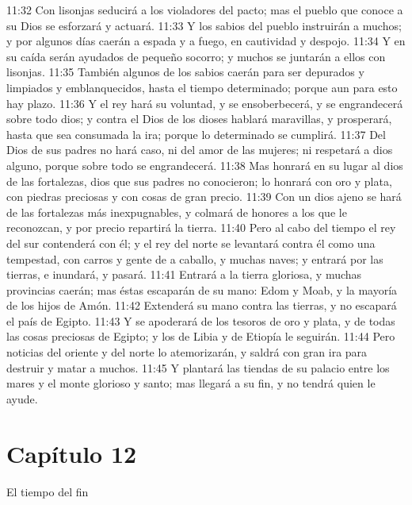 11:32 Con lisonjas seducirá a los violadores del pacto; mas el pueblo que conoce a su Dios se esforzará y actuará. 
11:33 Y los sabios del pueblo instruirán a muchos; y por algunos días caerán a espada y a fuego, en cautividad y despojo. 
11:34 Y en su caída serán ayudados de pequeño socorro; y muchos se juntarán a ellos con lisonjas. 
11:35 También algunos de los sabios caerán para ser depurados y limpiados y emblanquecidos, hasta el tiempo determinado; porque aun para esto hay plazo. 
11:36 Y el rey hará su voluntad, y se ensoberbecerá, y se engrandecerá sobre todo dios;  y contra el Dios de los dioses hablará maravillas, y prosperará, hasta que sea consumada la ira; porque lo determinado se cumplirá. 
11:37 Del Dios de sus padres no hará caso, ni del amor de las mujeres; ni respetará a dios alguno, porque sobre todo se engrandecerá. 
11:38 Mas honrará en su lugar al dios de las fortalezas, dios que sus padres no conocieron; lo honrará con oro y plata, con piedras preciosas y con cosas de gran precio. 
11:39 Con un dios ajeno se hará de las fortalezas más inexpugnables, y colmará de honores a los que le reconozcan, y por precio repartirá la tierra. 
11:40 Pero al cabo del tiempo el rey del sur contenderá con él; y el rey del norte se levantará contra él como una tempestad, con carros y gente de a caballo, y muchas naves; y entrará por las tierras, e inundará, y pasará. 
11:41 Entrará a la tierra gloriosa, y muchas provincias caerán; mas éstas escaparán de su mano: Edom y Moab, y la mayoría de los hijos de Amón. 
11:42 Extenderá su mano contra las tierras, y no escapará el país de Egipto. 
11:43 Y se apoderará de los tesoros de oro y plata, y de todas las cosas preciosas de Egipto; y los de Libia y de Etiopía le seguirán. 
11:44 Pero noticias del oriente y del norte lo atemorizarán, y saldrá con gran ira para destruir y matar a muchos. 
11:45 Y plantará las tiendas de su palacio entre los mares y el monte glorioso y santo; mas llegará a su fin, y no tendrá quien le ayude. 
\section*{Capítulo 12 }
El tiempo del fin 
 
